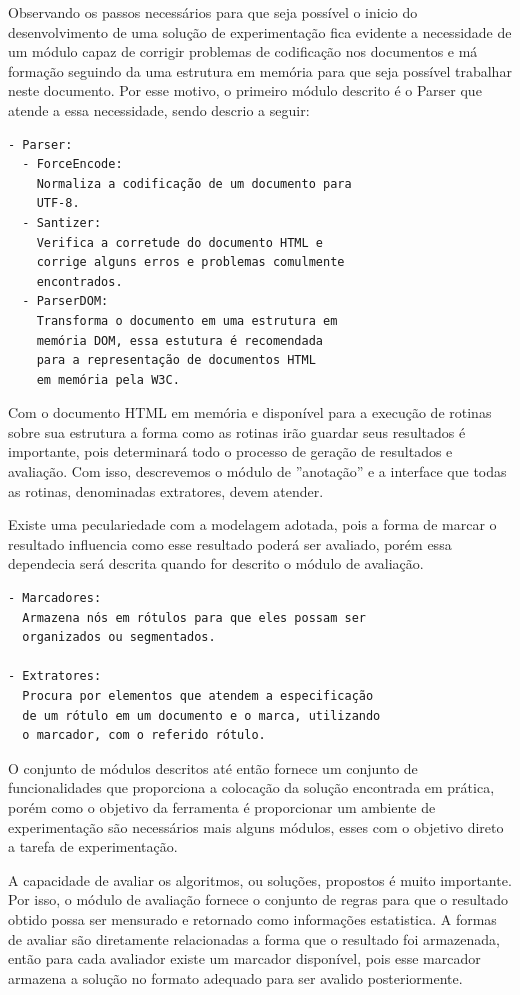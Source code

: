 \documentclass[12pt, a4paper]{article}
\begin{document}
Observando os passos necessários para que seja possível o inicio do
desenvolvimento de uma solução de experimentação fica evidente a
necessidade de um módulo capaz de corrigir problemas de
codificação nos documentos e má formação seguindo da uma estrutura em
memória para que seja possível trabalhar neste documento. Por esse
motivo, o primeiro módulo descrito é o Parser que atende a essa
necessidade, sendo descrio a seguir:

\begin{verbatim}
- Parser: 
  - ForceEncode:
    Normaliza a codificação de um documento para
    UTF-8.
  - Santizer:
    Verifica a corretude do documento HTML e
    corrige alguns erros e problemas comulmente
    encontrados.
  - ParserDOM:
    Transforma o documento em uma estrutura em
    memória DOM, essa estutura é recomendada
    para a representação de documentos HTML
    em memória pela W3C.
\end{verbatim}

Com o documento HTML em memória e disponível para a execução de rotinas
sobre sua estrutura a forma como as rotinas irão guardar seus resultados
é importante, pois determinará todo o processo de geração de resultados
e avaliação. Com isso, descrevemos o módulo de ''anotação'' e a interface
que todas as rotinas, denominadas extratores, devem atender.

Existe uma peculariedade com a modelagem adotada, pois a forma de marcar
o resultado influencia como esse resultado poderá ser avaliado, porém
essa dependecia será descrita quando for descrito o módulo de avaliação.

\begin{verbatim}
- Marcadores:
  Armazena nós em rótulos para que eles possam ser
  organizados ou segmentados.

- Extratores:
  Procura por elementos que atendem a especificação
  de um rótulo em um documento e o marca, utilizando
  o marcador, com o referido rótulo.
\end{verbatim}

O conjunto de módulos descritos até então fornece um conjunto de
funcionalidades que proporciona a colocação da solução encontrada em
prática, porém como o objetivo da ferramenta é proporcionar um ambiente
de experimentação são necessários mais alguns módulos, esses com o
objetivo direto a tarefa de experimentação.

A capacidade de avaliar os algoritmos, ou soluções, propostos é muito
importante. Por isso, o módulo de avaliação fornece o conjunto de regras
para que o resultado obtido possa ser mensurado e retornado como
informações estatistica. A formas de avaliar são diretamente
relacionadas a forma que o resultado foi armazenada, então para cada
avaliador existe um marcador disponível, pois esse marcador armazena a
solução no formato adequado para ser avalido posteriormente.
\end{document}
